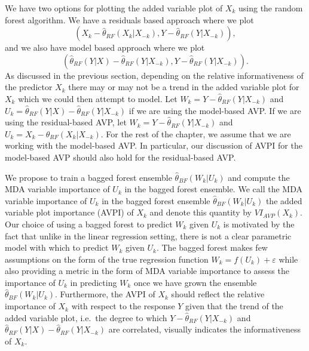 \documentclass[12pt,twoside]{reedthesis}
\theoremstyle{definition}
\theoremstyle{definition}
\theoremstyle{definition}
\theoremstyle{remark}
\begin{document}
We have two options for plotting the added variable plot of \(X_k\)
using the random forest algorithm. We have a residuals based approach
where we plot
\[(X_k-\hat{\theta}_{RF}(X_k|X_{-k}),Y-\hat{\theta}_{RF}(Y|X_{-k})),\]
and we also have model based approach where we plot
\[(\hat{\theta}_{RF}(Y|X)-\hat{\theta}_{RF}(Y|X_{-k}), Y-\hat{\theta}_{RF}(Y|X_{-k})).\]
As discussed in the previous section, depending on the relative
informativeness of the predictor \(X_k\) there may or may not be a trend
in the added variable plot for \(X_k\) which we could then attempt to
model. Let \(W_k=Y-\hat{\theta}_{RF}(Y|X_{-k})\) and
\(U_k=\hat{\theta}_{RF}(Y|X)-\hat{\theta}_{RF}(Y|X_{-k})\) if we are
using the model-based AVP. If we are using the residual-based AVP, let
\(W_k=Y-\hat{\theta}_{RF}(Y|X_{-k})\) and
\(U_k=X_k-\hat{\theta}_{RF}(X_k|X_{-k})\). For the rest of the chapter,
we assume that we are working with the model-based AVP. In particular,
our discussion of AVPI for the model-based AVP should also hold for the
residual-based AVP. \par 

We propose to train a bagged forest ensemble
\(\hat{\theta}_{BF}(W_k|U_k)\) and compute the MDA variable importance
of \(U_k\) in the bagged forest ensemble. We call the MDA variable
importance of \(U_k\) in the bagged forest ensemble
\(\hat{\theta}_{BF}(W_k|U_k)\) the added variable plot importance (AVPI)
of \(X_k\) and denote this quantity by \(VI_{AVP}(X_k)\). Our choice of
using a bagged forest to predict \(W_k\) given \(U_k\) is motivated by
the fact that unlike in the linear regression setting, there is not a
clear parametric model with which to predict \(W_k\) given \(U_k\). The
bagged forest makes few assumptions on the form of the true regression
function \(W_k=f(U_k)+\varepsilon\) while also providing a metric in the
form of MDA variable importance to assess the importance of \(U_k\) in
predicting \(W_k\) once we have grown the ensemble
\(\hat{\theta}_{BF}(W_k|U_k)\). Furthermore, the AVPI of \(X_k\) should
reflect the relative importance of \(X_k\) with respect to the response
\(Y\) given that the trend of the added variable plot, i.e.~the degree
to which \(Y-\hat{\theta}_{RF}(Y|X_{-k})\) and
\(\hat{\theta}_{RF}(Y|X)-\hat{\theta}_{RF}(Y|X_{-k})\) are correlated,
visually indicates the informativeness of \(X_k\).
\end{document}
